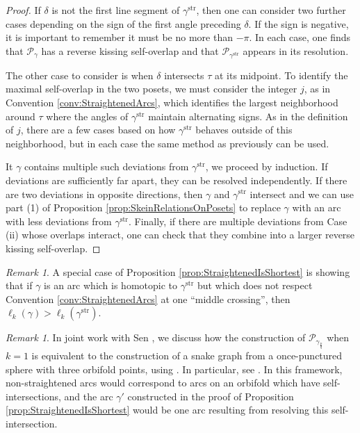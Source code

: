 \documentclass[12pt, letterpaper,table]{amsart}
\theoremstyle{remark}
\newtheorem{remark}[theorem]{Remark}
\newcommand{\fpq}{\frac{p}{q}}
\newcommand{\calP}{\mathcal{P}}
\newcommand{\stir}{\mathrm{str}}
\begin{document}
\begin{proof}
If $\delta$ is not the first line segment of $\gamma^\stir$, then one can consider two further cases depending on the sign of the first angle preceding $\delta$. If the sign is negative, it is important to remember it must be no more than $-\pi$. In each case, one finds that $\calP_\gamma$ has a reverse kissing self-overlap and that $\calP_{\gamma^\stir}$ appears in its resolution. 

The other case to consider is when $\delta$ intersects $\tau$ at its midpoint. To identify the maximal self-overlap in the two posets, we must consider the integer $j$, as in Convention \ref{conv:StraightenedArcs}, which identifies the largest neighborhood around $\tau$ where the angles of $\gamma^\stir$ maintain alternating signs. As in the definition of $j$, there are a few cases based on how $\gamma^\stir$ behaves outside of this neighborhood, but in each case the same method as previously can be used. 

It $\gamma$ contains multiple such deviations from $\gamma^\stir$, we proceed by induction. If deviations are sufficiently far apart, they can be resolved independently. If there are two deviations in opposite directions, then $\gamma$ and $\gamma^\stir$ intersect and we can use part (1) of Proposition \ref{prop:SkeinRelationsOnPosets}  to replace $\gamma$ with an arc with less deviations from $\gamma^\stir$. Finally, if there are multiple deviations from Case (ii) whose overlaps interact, one can check that they combine into a larger reverse kissing self-overlap.  

\end{proof}

\begin{remark}\label{rem:MustRespectConvention}
A special case of Proposition \ref{prop:StraightenedIsShortest} is showing that if $\gamma$ is an arc which is homotopic to $\gamma^\stir$ but which does not respect Convention \ref{conv:StraightenedArcs} at one ``middle crossing'', then $\ell_k(\gamma) > \ell_k(\gamma^\stir)$.
\end{remark}


\begin{remark}
In joint work with Sen \cite{banaian2024generalization}, we discuss how the construction of $\calP_{\gamma_\fpq}$ when $k = 1$ is equivalent to the construction of a snake graph from a once-punctured sphere with three orbifold points, using \cite{BanaianKelley}. In particular, see \cite[Theorem 5]{banaian2024generalization}. In this framework, non-straightened arcs would correspond to arcs on an orbifold which have self-intersections, and the arc $\gamma'$ constructed in the proof of Proposition \ref{prop:StraightenedIsShortest} would be one arc resulting from resolving this self-intersection. 
\end{remark}
\end{document}
